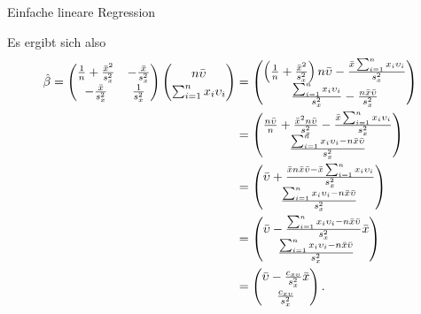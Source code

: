 \documentclass[
  8pt,
  ignorenonframetext,
]{beamer}
\begin{document}
\begin{frame}{Einfache lineare Regression}
\protect\hypertarget{einfache-lineare-regression-6}{}
\footnotesize

Es ergibt sich also \begin{align}
\renewcommand{\arraystretch}{1.2}
\begin{split}
\hat{\beta}
= \begin{pmatrix}
  \frac{1}{n} + \frac{\bar{x}^2}{s_x^2}
& -\frac{\bar{x}}{s_x^2}
\\
  -\frac{\bar{x}}{s_x^2}
&  \frac{1}{s_x^2}
\end{pmatrix}
\begin{pmatrix}
n\bar{\upsilon}    \\
\sum_{i=1}^n x_i \upsilon_i    \\
\end{pmatrix}
& = \begin{pmatrix}
\left(\frac{1}{n} + \frac{\bar{x}^2}{s_x^2}\right)n\bar{\upsilon} - \frac{\bar{x}\sum_{i=1}^n x_i\upsilon_i}{s_x^2}   \\
\frac{\sum_{i=1}^n x_i \upsilon_i }{s_x^2} - \frac{n\bar{x}\bar{\upsilon}}{s_x^2} \\
\end{pmatrix}
\\
&
=
\begin{pmatrix}
\frac{n\bar{\upsilon}}{n} + \frac{\bar{x}^2n\bar{\upsilon}}{s_x^2}- \frac{\bar{x}\sum_{i=1}^n x_i\upsilon_i}{s_x^2}
\\
\frac{\sum_{i=1}^n x_i \upsilon_i - n\bar{x}\bar{\upsilon}}{s_x^2}    \\
\end{pmatrix}
\\
& =
\begin{pmatrix}
\bar{\upsilon} + \frac{\bar{x}n\bar{x}\bar{\upsilon} - \bar{x}\sum_{i=1}^n x_i\upsilon_i}{s_x^2}
\\
\frac{\sum_{i=1}^n x_i \upsilon_i - n\bar{x}\bar{\upsilon}}{s_x^2}    \\
\end{pmatrix}
\\
& =
\begin{pmatrix}
\bar{\upsilon} - \frac{\sum_{i=1}^n x_i\upsilon_i - n\bar{x}\bar{\upsilon}}{s_x^2}\bar{x}
\\
\frac{\sum_{i=1}^n x_i \upsilon_i - n\bar{x}\bar{\upsilon}}{s_x^2}
\end{pmatrix}
\\
& =
\begin{pmatrix}
\bar{\upsilon} - \frac{c_{x\upsilon}}{s_x^2}\bar{x}
\\
\frac{c_{x\upsilon}}{s_x^2}
\end{pmatrix}.
\end{split}
\end{align}
\end{frame}
\end{document}
